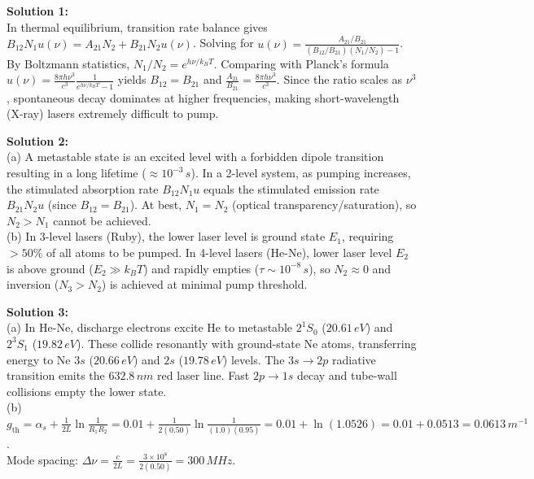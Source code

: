 \begin{solutionbox}
\textbf{Solution 1:}\\
In thermal equilibrium, transition rate balance gives $B_{12} N_1 u(\nu) = A_{21} N_2 + B_{21} N_2 u(\nu)$. Solving for $u(\nu) = \frac{A_{21}/B_{21}}{(B_{12}/B_{21})(N_1/N_2) - 1}$. By Boltzmann statistics, $N_1/N_2 = e^{h\nu/k_B T}$. Comparing with Planck's formula $u(\nu) = \frac{8\pi h\nu^3}{c^3}\frac{1}{e^{h\nu/k_B T}-1}$ yields $B_{12} = B_{21}$ and $\frac{A_{21}}{B_{21}} = \frac{8\pi h\nu^3}{c^3}$. Since the ratio scales as $\nu^3$, spontaneous decay dominates at higher frequencies, making short-wavelength (X-ray) lasers extremely difficult to pump.

\vspace{0.3cm}
\textbf{Solution 2:}\\
(a) A metastable state is an excited level with a forbidden dipole transition resulting in a long lifetime ($\approx 10^{-3}\,\si{s}$). In a 2-level system, as pumping increases, the stimulated absorption rate $B_{12} N_1 u$ equals the stimulated emission rate $B_{21} N_2 u$ (since $B_{12}=B_{21}$). At best, $N_1 = N_2$ (optical transparency/saturation), so $N_2 > N_1$ cannot be achieved.\\
(b) In 3-level lasers (Ruby), the lower laser level is ground state $E_1$, requiring $>50\%$ of all atoms to be pumped. In 4-level lasers (He-Ne), lower laser level $E_2$ is above ground ($E_2 \gg k_B T$) and rapidly empties ($\tau \sim 10^{-8}\,\si{s}$), so $N_2 \approx 0$ and inversion ($N_3 > N_2$) is achieved at minimal pump threshold.

\vspace{0.3cm}
\textbf{Solution 3:}\\
(a) In He-Ne, discharge electrons excite He to metastable $2^1S_0$ ($20.61\,\si{eV}$) and $2^3S_1$ ($19.82\,\si{eV}$). These collide resonantly with ground-state Ne atoms, transferring energy to Ne $3s$ ($20.66\,\si{eV}$) and $2s$ ($19.78\,\si{eV}$) levels. The $3s \to 2p$ radiative transition emits the $632.8\,\si{nm}$ red laser line. Fast $2p \to 1s$ decay and tube-wall collisions empty the lower state.\\
(b) $g_{\text{th}} = \alpha_s + \frac{1}{2L}\ln\frac{1}{R_1 R_2} = 0.01 + \frac{1}{2(0.50)}\ln\frac{1}{(1.0)(0.95)} = 0.01 + \ln(1.0526) = 0.01 + 0.0513 = 0.0613\,\si{m^{-1}}$.\\
Mode spacing: $\Delta \nu = \frac{c}{2L} = \frac{3 \times 10^8}{2(0.50)} = 300\,\si{MHz}$.


\end{solutionbox}
